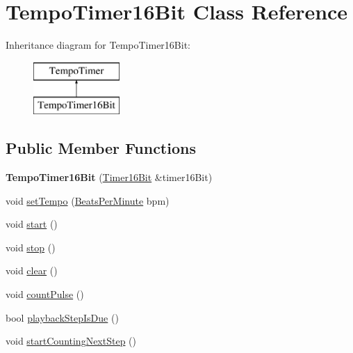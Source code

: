 \hypertarget{class_tempo_timer16_bit}{}\section{Tempo\+Timer16\+Bit Class Reference}
\label{class_tempo_timer16_bit}
Inheritance diagram for Tempo\+Timer16\+Bit\+:\begin{figure}[H]
\begin{center}
\leavevmode
\includegraphics[height=2.000000cm]{class_tempo_timer16_bit}
\end{center}
\end{figure}
\subsection*{Public Member Functions}
\begin{DoxyCompactItemize}
\item 
\mbox{\label{class_tempo_timer16_bit_ad1d65ddce9cb60487b7c47f0b4a46dd3}} 
{\bfseries Tempo\+Timer16\+Bit} (\mbox{\hyperlink{class_timer16_bit}{Timer16\+Bit}} \&timer16\+Bit)
\item 
void \mbox{\hyperlink{class_tempo_timer16_bit_adbd6f0e4af015b240e65109a128988a4}{set\+Tempo}} (\mbox{\hyperlink{class_beats_per_minute}{Beats\+Per\+Minute}} bpm)
\item 
void \mbox{\hyperlink{class_tempo_timer16_bit_a84b46988dda79e20172382417966de13}{start}} ()
\item 
void \mbox{\hyperlink{class_tempo_timer16_bit_abb43b9ec84b965feaf3062aa1cb5be5e}{stop}} ()
\item 
void \mbox{\hyperlink{class_tempo_timer16_bit_a749e01b62ff3ff184c62a99db70588ba}{clear}} ()
\item 
void \mbox{\hyperlink{class_tempo_timer16_bit_a1dcf447b3ffdeadfc65f8bd3da24c632}{count\+Pulse}} ()
\item 
bool \mbox{\hyperlink{class_tempo_timer16_bit_a480d726dc86d7136904056ac4b37082b}{playback\+Step\+Is\+Due}} ()
\item 
void \mbox{\hyperlink{class_tempo_timer16_bit_a1f5d42ac7fe24317a0c04484bbf345c6}{start\+Counting\+Next\+Step}} ()
\end{DoxyCompactItemize}


